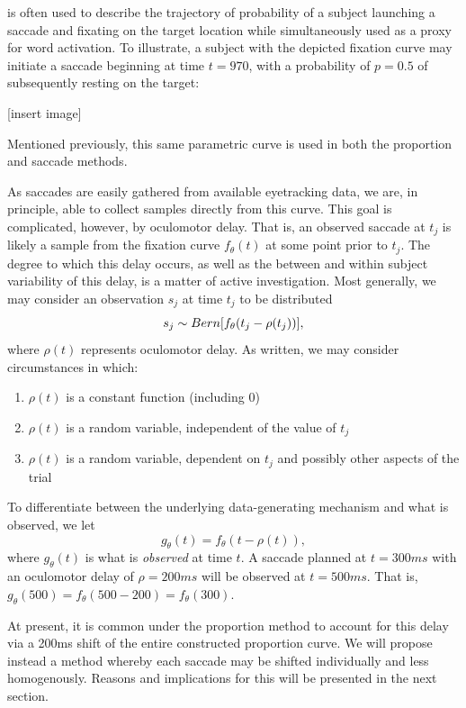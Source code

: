 \documentclass{article}
\begin{document}
is often used to describe the trajectory of probability of a subject launching a saccade and fixating on the target location while simultaneously used as a proxy for word activation. To illustrate, a subject with the depicted fixation curve may initiate a saccade beginning at time $t = 970$, with a probability of $p = 0.5$ of subsequently resting on the target:

[insert image]


Mentioned previously, this same parametric curve is used in both the proportion and saccade methods.

As saccades are easily gathered from available eyetracking data, we are, in principle, able to collect samples directly from this curve. This goal is complicated, however, by oculomotor delay. That is, an observed saccade at $t_j$ is likely a sample from the fixation curve $f_{\theta}(t)$ at some point prior to $t_j$. The degree to which this delay occurs, as well as the between and within subject variability of this delay, is a matter of active investigation. Most generally, we may consider an observation $s_j$ at time $t_j$ to be distributed
$$
s_j \sim  Bern \large[f_{\theta}(t_j - \rho(t_j)) \large],
$$ 
where $\rho(t)$ represents oculomotor delay. As written, we may consider circumstances in which:

\begin{enumerate}
\item $\rho(t)$ is a constant function (including 0)
\item $\rho(t)$ is a random variable, independent of the value of $t_j$
\item $\rho(t)$ is a random variable, dependent on $t_j$ and possibly other aspects of the trial
\end{enumerate}

To differentiate between the underlying data-generating mechanism and what is observed, we let
$$
g_{\theta}(t) = f_{\theta}(t - \rho(t)), 
$$
where $g_{\theta}(t)$ is what is \textit{observed} at time $t$. A saccade planned at $t = 300ms$ with an oculomotor delay of $\rho = 200ms$ will be observed at $t = 500ms$. That is, $g_{\theta}(500) = f_{\theta}(500 - 200) = f_{\theta}(300)$.

At present, it is common under the proportion method to account for this delay via a 200ms shift of the entire constructed proportion curve. We will propose instead a method whereby each saccade may be shifted individually and less homogenously. Reasons and implications for this will be presented in the next section.
\end{document}

